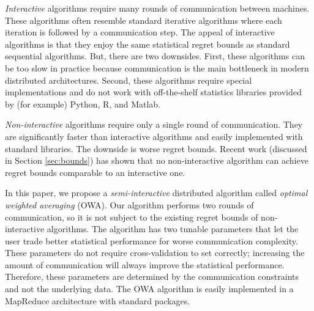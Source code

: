 \documentclass[twoside]{article}
\begin{document}
\emph{Interactive} algorithms require many rounds of communication between machines.
These algorithms often resemble standard iterative algorithms where each iteration is followed by a communication step.
The appeal of interactive algorithms is that they enjoy the same statistical regret bounds as standard sequential algorithms.
But, there are two downsides.
First, these algorithms can be too slow in practice because communication is the main bottleneck in modern distributed architectures.
Second, these algorithms require special implementations and do not work with off-the-shelf statistics libraries provided by (for example) Python, R, and Matlab.

\emph{Non-interactive} algorithms require only a single round of communication.
They are significantly faster than interactive algorithms and  easily implemented with standard libraries.
The downside is worse regret bounds.
Recent work (discussed in Section \ref{sec:bounds}) has shown that no non-interactive algorithm can achieve regret bounds comparable to an interactive one.

In this paper, we propose a \emph{semi-interactive} distributed algorithm called \emph{optimal weighted averaging} (OWA).
Our algorithm performs two rounds of communication,
so it is not subject to the existing regret bounds of non-interactive algorithms.
The algorithm has two tunable parameters that let the user trade better statistical performance for worse communication complexity.
These parameters do not require cross-validation to set correctly;
increasing the amount of communication will always improve the statistical performance.
Therefore, these parameters are determined by the communication constraints and not the underlying data.
The OWA algorithm is easily implemented in a MapReduce architecture with standard packages.

\end{document}
